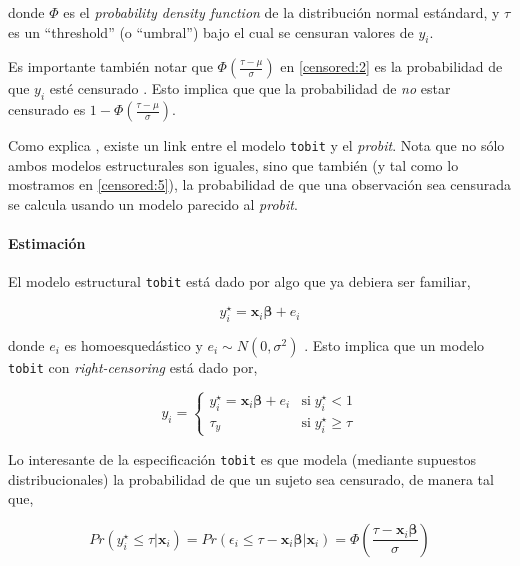 \documentclass[onesided]{article}\usepackage[]{graphicx}\usepackage[]{color}
\begin{document}
donde $\Phi$ es el \emph{probability density function} de la distribuci\'on normal est\'andard, y $\tau$ es un ``threshold'' (o ``umbral'') bajo el cual se censuran valores de $y_{i}$. 

Es importante tambi\'en notar que $\Phi(\frac{\tau-\mu}{\sigma})$ en \autoref{censored:2} es la probabilidad de que $y_{i}$ est\'e censurado \parencite[195]{Long1997}. Esto implica que que la probabilidad de \emph{no} estar censurado es $1-\Phi(\frac{\tau-\mu}{\sigma})$. 

Como explica \textcite[199]{Long1997}, existe un link entre el modelo \texttt{tobit} y el \emph{probit}. Nota que no s\'olo ambos modelos estructurales son iguales, sino que tambi\'en (y tal como lo mostramos en \autoref{censored:5}), la probabilidad de que una observaci\'on sea censurada se calcula usando un modelo parecido al \emph{probit}.

\paragraph{Estimaci\'on} 


El modelo estructural \texttt{tobit} est\'a dado por algo que ya debiera ser familiar,


\begin{equation}\label{censored:3}
y_{i}^{\star} = \boldsymbol{x}_{i}\boldsymbol{\beta} + e_{i}
\end{equation}

donde $e_{i}$ es homoesqued\'astico y $e_{i}\sim N (0, \sigma^{2})$ \parencite[206]{Long1997}. Esto implica que un modelo \texttt{tobit} con \emph{right-censoring} est\'a dado por,

\[
    y_{i}= 
\begin{cases}\label{censored:4}
    y_{i}^{\star} = \boldsymbol{x}_{i}\boldsymbol{\beta} + e_{i}  & \text{si} \; y_{i}^{\star} < 1 \\
    \tau_{y}           & \text{si} \; y_{i}^{\star} \geq \tau
\end{cases}
\]

Lo interesante de la especificaci\'on \texttt{tobit} es que modela (mediante supuestos distribucionales) la probabilidad de que un sujeto sea censurado, de manera tal que,

\begin{equation}\label{censored:5}
Pr(y_{i}^{\star} \leq \tau | \boldsymbol{x}_{i}) = Pr(\epsilon_{i} \leq \tau - \boldsymbol{x}_{i}\boldsymbol{\beta}|\boldsymbol{x}_{i}) = \Phi(\frac{\tau-\boldsymbol{x}_{i}\boldsymbol{\beta}}{\sigma})
\end{equation}
\end{document}
